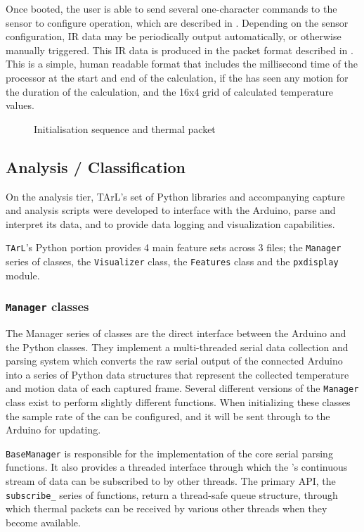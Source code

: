 \documentclass[../thesis/thesis.tex]{subfiles}
\begin{document}
Once booted, the user is able to send several one-character commands to the sensor to configure operation, which are described in . Depending on the sensor configuration, IR data may be periodically output automatically, or otherwise manually triggered. This IR data is produced in the packet format described in . This is a simple, human readable format that includes the millisecond time of the processor at the start and end of the calculation, if the \pir has seen any motion for the duration of the calculation, and the 16x4 grid of calculated temperature values.

\begin{figure}
 \centering

\caption{Initialisation sequence and thermal packet}
\label{fig:code:initseq}
\end{figure}

\subsection{Analysis / Classification}

On the analysis tier, TArL's set of Python libraries and accompanying capture and analysis scripts were developed to interface with the Arduino, parse and interpret its data, and to provide data logging and visualization capabilities.

\texttt{TArL}'s Python portion provides 4 main feature sets across 3 files; the \texttt{Manager} series of classes, the \texttt{Visualizer} class, the \texttt{Features} class and the \texttt{pxdisplay} module.

\subsubsection*{\texttt{Manager} classes}
The Manager series of classes are the direct interface between the Arduino and the Python classes. They implement a multi-threaded serial data collection and parsing system which converts the raw serial output of the connected Arduino into a series of Python data structures that represent the collected temperature and motion data of each captured frame. Several different versions of the \texttt{Manager} class exist to perform slightly different functions. When initializing these classes the sample rate of the \mlx can be configured, and it will be sent through to the Arduino for updating.

\texttt{BaseManager} is responsible for the implementation of the core serial parsing functions. It also provides a threaded interface through which the \mlx's continuous stream of data can be subscribed to by other threads. The primary API, the \texttt{subscribe\_} series of functions, return a thread-safe queue structure, through which thermal packets can be received by various other threads when they become available.
\end{document}
